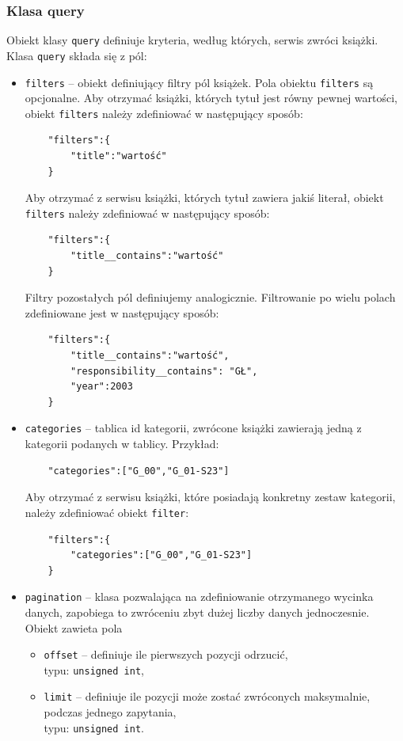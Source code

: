 \documentclass[twoside]{projektInzynierskiMS}
\begin{document}
\subsubsection{Klasa query}
Obiekt klasy \verb`query` definiuje kryteria, według których, serwis zwróci książki. Klasa \verb`query` składa się z pól:
\begin{itemize}
	\item \verb`filters` -- obiekt definiujący filtry pól książek. Pola obiektu \verb`filters` są opcjonalne. Aby otrzymać książki, których tytuł jest równy pewnej wartości, obiekt \verb`filters` należy zdefiniować w następujący sposób:
	
	\begin{verbatim}
	"filters":{
	    "title":"wartość"
	}
	\end{verbatim}
	
Aby otrzymać z serwisu książki, których tytuł zawiera jakiś literał, obiekt \verb`filters` należy zdefiniować w następujący sposób:
	\begin{verbatim}
	"filters":{
	    "title__contains":"wartość"
	}
	\end{verbatim}
	
Filtry pozostałych pól definiujemy analogicznie. Filtrowanie po wielu polach zdefiniowane jest w następujący sposób:

	\begin{verbatim}
	"filters":{
	    "title__contains":"wartość",
	    "responsibility__contains": "GŁ",
	    "year":2003
	}
	\end{verbatim}
	
\item \verb`categories` -- tablica id kategorii, zwrócone książki zawierają jedną z kategorii podanych w tablicy. Przykład:

	\begin{verbatim}
	"categories":["G_00","G_01-S23"]
	\end{verbatim}

Aby otrzymać z serwisu książki, które posiadają konkretny zestaw kategorii, należy zdefiniować obiekt \verb`filter`:
 
	\begin{verbatim}
	"filters":{
	    "categories":["G_00","G_01-S23"]
	}
	\end{verbatim}

\item \verb`pagination` -- klasa pozwalająca na zdefiniowanie otrzymanego wycinka danych, zapobiega to zwróceniu zbyt dużej liczby danych jednoczesnie. Obiekt zawieta pola 
\begin{itemize}
	\item \verb`offset` -- definiuje ile pierwszych pozycji odrzucić,\\
	typu: \verb`unsigned int`,
	\item \verb`limit` -- definiuje ile pozycji może zostać zwróconych maksymalnie, podczas jednego zapytania,\\
	typu: \verb`unsigned int`.
\end{itemize}
 

\end{itemize}
\end{document}
